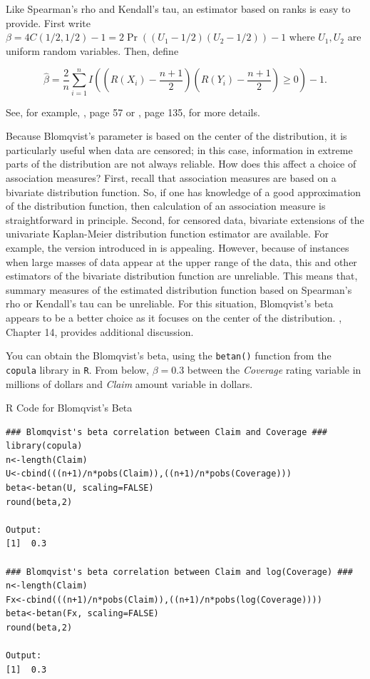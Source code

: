 \documentclass[]{book}
\theoremstyle{definition}
\theoremstyle{definition}
\theoremstyle{definition}
\theoremstyle{remark}
\begin{document}
Like Spearman's rho and Kendall's tau, an estimator based on ranks is
easy to provide. First write
\(\beta = 4C(1/2,1/2)-1 = 2\Pr((U_1-1/2)(U_2-1/2))-1\) where
\(U_1, U_2\) are uniform random variables. Then, define

\begin{equation*}
\hat{\beta} = \frac{2}{n} \sum_{i=1}^n I\left( (R(X_{i})-\frac{n+1}{2})(R(Y_{i})-\frac{n+1}{2}) \ge 0 \right)-1 .
\end{equation*}

See, for example, \citep{joe2014dependence}, page 57 or
\citep{hougaard2000analysis}, page 135, for more details.

Because Blomqvist's parameter is based on the center of the
distribution, it is particularly useful when data are censored; in this
case, information in extreme parts of the distribution are not always
reliable. How does this affect a choice of association measures? First,
recall that association measures are based on a bivariate distribution
function. So, if one has knowledge of a good approximation of the
distribution function, then calculation of an association measure is
straightforward in principle. Second, for censored data, bivariate
extensions of the univariate Kaplan-Meier distribution function
estimator are available. For example, the version introduced in
\citep{dabrowska1988kaplan} is appealing. However, because of instances
when large masses of data appear at the upper range of the data, this
and other estimators of the bivariate distribution function are
unreliable. This means that, summary measures of the estimated
distribution function based on Spearman's rho or Kendall's tau can be
unreliable. For this situation, Blomqvist's beta appears to be a better
choice as it focuses on the center of the distribution.
\citep{hougaard2000analysis}, Chapter 14, provides additional
discussion.

You can obtain the Blomqvist's beta, using the \texttt{betan()} function
from the \texttt{copula} library in \texttt{R}. From below,
\(\beta=0.3\) between the \emph{Coverage} rating variable in millions of
dollars and \emph{Claim} amount variable in dollars.

R Code for Blomqvist's Beta

\hypertarget{display.beta.2}{}
\begin{verbatim}
### Blomqvist's beta correlation between Claim and Coverage ###
library(copula)
n<-length(Claim)
U<-cbind(((n+1)/n*pobs(Claim)),((n+1)/n*pobs(Coverage)))
beta<-betan(U, scaling=FALSE)
round(beta,2)

Output:
[1]  0.3

### Blomqvist's beta correlation between Claim and log(Coverage) ###
n<-length(Claim)
Fx<-cbind(((n+1)/n*pobs(Claim)),((n+1)/n*pobs(log(Coverage))))
beta<-betan(Fx, scaling=FALSE)
round(beta,2)

Output:
[1]  0.3
\end{verbatim}
\end{document}
